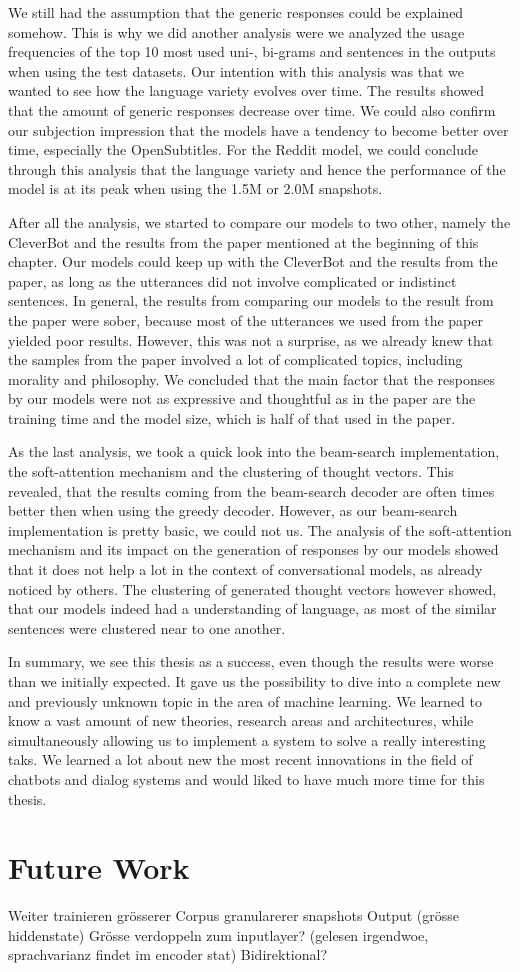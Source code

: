 We still had the assumption that the generic responses could be explained somehow. This is why we did another analysis were we analyzed the usage frequencies of the top 10 most used uni-, bi-grams and sentences in the outputs when using the test datasets. Our intention with this analysis was that we wanted to see how the language variety evolves over time. The results showed that the amount of generic responses decrease over time. We could also confirm our subjection impression that the models have a tendency to become better over time, especially the OpenSubtitles. For the Reddit model, we could conclude through this analysis that the language variety and hence the performance of the model is at its peak when using the 1.5M or 2.0M snapshots.

After all the analysis, we started to compare our models to two other, namely the CleverBot and the results from the paper mentioned at the beginning of this chapter. Our models could keep up with the CleverBot and the results from the paper, as long as the utterances did not involve complicated or indistinct sentences. In general, the results from comparing our models to the result from the paper were sober, because most of the utterances we used from the paper yielded poor results. However, this was not a surprise, as we already knew that the samples from the paper involved a lot of complicated topics, including morality and philosophy. We concluded that the main factor that the responses by our models were not as expressive and thoughtful as in the paper are the training time and the model size, which is half of that used in the paper.

As the last analysis, we took a quick look into the beam-search implementation, the soft-attention mechanism and the clustering of thought vectors. This revealed, that the results coming from the beam-search decoder are often times better then when using the greedy decoder. However, as our beam-search implementation is pretty basic, we could not us. The analysis of the soft-attention mechanism and its impact on the generation of responses by our models showed that it does not help a lot in the context of conversational models, as already noticed by others. The clustering of generated thought vectors however showed, that our models indeed had a understanding of language, as most of the similar sentences were clustered near to one another.

In summary, we see this thesis as a success, even though the results were worse than we initially expected. It gave us the possibility to dive into a complete new and previously unknown topic in the area of machine learning. We learned to know a vast amount of new theories, research areas and architectures, while simultaneously allowing us to implement a system to solve a really interesting taks. We learned a lot about new the most recent innovations in the field of chatbots and dialog systems and would liked to have much more time for this thesis.

\chapter{Future Work}
Weiter trainieren
grösserer Corpus
granularerer snapshots
Output (grösse hiddenstate) Grösse verdoppeln zum inputlayer? (gelesen irgendwoe, sprachvarianz findet im encoder stat)
Bidirektional?